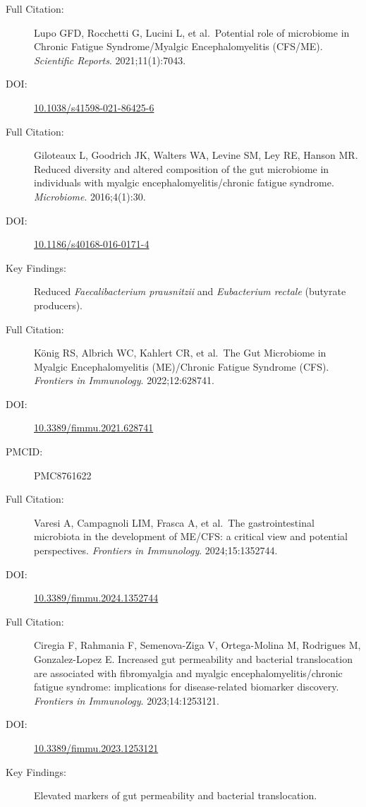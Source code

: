 \begin{description}
    \item[Full Citation:] Lupo GFD, Rocchetti G, Lucini L, et al.\ Potential role of microbiome in Chronic Fatigue Syndrome/Myalgic Encephalomyelitis (CFS/ME). \textit{Scientific Reports}. 2021;11(1):7043.
    \item[DOI:] \href{https://doi.org/10.1038/s41598-021-86425-6}{10.1038/s41598-021-86425-6}
\end{description}

\begin{description}
    \item[Full Citation:] Giloteaux L, Goodrich JK, Walters WA, Levine SM, Ley RE, Hanson MR. Reduced diversity and altered composition of the gut microbiome in individuals with myalgic encephalomyelitis/chronic fatigue syndrome. \textit{Microbiome}. 2016;4(1):30.
    \item[DOI:] \href{https://doi.org/10.1186/s40168-016-0171-4}{10.1186/s40168-016-0171-4}
    \item[Key Findings:] Reduced \textit{Faecalibacterium prausnitzii} and \textit{Eubacterium rectale} (butyrate producers).
\end{description}

\begin{description}
    \item[Full Citation:] K\"onig RS, Albrich WC, Kahlert CR, et al.\ The Gut Microbiome in Myalgic Encephalomyelitis (ME)/Chronic Fatigue Syndrome (CFS). \textit{Frontiers in Immunology}. 2022;12:628741.
    \item[DOI:] \href{https://doi.org/10.3389/fimmu.2021.628741}{10.3389/fimmu.2021.628741}
    \item[PMCID:] PMC8761622
\end{description}

\begin{description}
    \item[Full Citation:] Varesi A, Campagnoli LIM, Frasca A, et al.\ The gastrointestinal microbiota in the development of ME/CFS: a critical view and potential perspectives. \textit{Frontiers in Immunology}. 2024;15:1352744.
    \item[DOI:] \href{https://doi.org/10.3389/fimmu.2024.1352744}{10.3389/fimmu.2024.1352744}
\end{description}

\begin{description}
    \item[Full Citation:] Ciregia F, Rahmania F, Semenova-Ziga V, Ortega-Molina M, Rodrigues M, Gonzalez-Lopez E. Increased gut permeability and bacterial translocation are associated with fibromyalgia and myalgic encephalomyelitis/chronic fatigue syndrome: implications for disease-related biomarker discovery. \textit{Frontiers in Immunology}. 2023;14:1253121.
    \item[DOI:] \href{https://doi.org/10.3389/fimmu.2023.1253121}{10.3389/fimmu.2023.1253121}
    \item[Key Findings:] Elevated markers of gut permeability and bacterial translocation.
\end{description}

